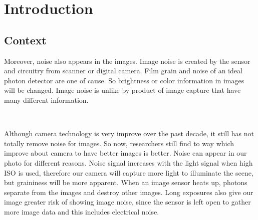 \chapter{Introduction}






\section{Context}



Moreover, noise also appears in the images. Image noise is created by the sensor and
circuitry from scanner or digital camera. Film grain and noise of an ideal photon detector
are one of cause. So brightness or color information in images will be changed. Image
noise is unlike by product of image capture that have many different information.

\

Although camera technology is very improve over the past
decade, it still has not totally remove noise for images. So now, researchers still find to
way which improve about camera to have better images is better. Noise can appear in our
photo for different reasons. Noise signal increases with the light signal when high ISO is
used, therefore our camera will capture more light to illuminate the scene, but graininess
will be more apparent. When an image sensor heats up, photons separate from
the images and destroy other images. Long exposures also give our image greater risk of
showing image noise, since the sensor is left open to gather more image data and this
includes electrical noise.

